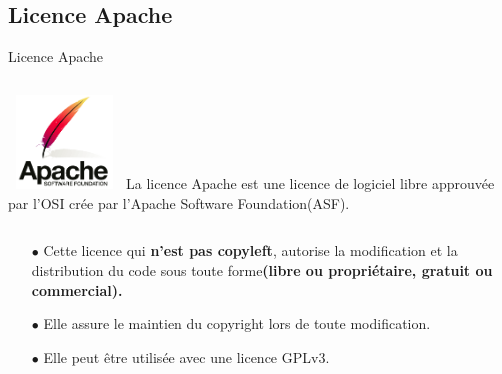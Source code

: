 \subsection{Licence Apache}
\begin{frame}[t,fragile]{Licence Apache}
    \fontsize{10}{12}\selectfont
    \begin{columns}
            \centering \includegraphics[height=2.5cm, width=3cm]{apache_feather}
            La licence Apache est une licence de logiciel libre approuvée par l'OSI crée par l'Apache Software Foundation(ASF).\pause
    \end{columns}
    \begin{itemize}
        \item[$\bullet$] Cette licence qui \textbf{n'est pas copyleft}, autorise la modification et la distribution du code sous toute forme\textbf{(libre ou propriétaire, gratuit ou commercial).}\pause 
        \item[$\bullet$] Elle assure le maintien du copyright lors de toute modification.\pause
        \item[$\bullet$] Elle peut être utilisée avec une licence GPLv3.
    \end{itemize}
\end{frame}

